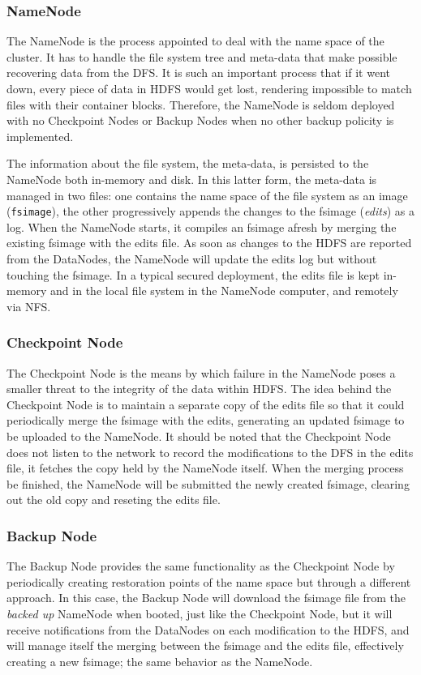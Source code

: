 \subsubsection{NameNode}\label{subsubsec:namenode}
\noindent The NameNode is the process appointed to deal with the name space of the cluster. It has to handle the file system tree and meta-data that make possible recovering data from the DFS. It is such an important process that if it went down, every piece of data in HDFS would get lost, rendering impossible to match files with their container blocks. Therefore, the NameNode is seldom deployed with no Checkpoint Nodes or Backup Nodes when no other backup policity is implemented.

The information about the file system, the meta-data, is persisted to the NameNode both in-memory and disk. In this latter form, the meta-data is managed in two files: one contains the name space of the file system as an image (\texttt{fsimage}), the other progressively appends the changes to the fsimage (\emph{edits}) as a log. When the NameNode starts, it compiles an fsimage afresh by merging the existing fsimage with the edits file. As soon as changes to the HDFS are reported from the DataNodes, the NameNode will update the edits log but without touching the fsimage. In a typical secured deployment, the edits file is kept in-memory and in the local file system in the NameNode computer, and remotely via NFS.

\subsubsection{Checkpoint Node}\label{subsubsec:checkpointnode}
\noindent The Checkpoint Node is the means by which failure in the NameNode poses a smaller threat to the integrity of the data within HDFS. The idea behind the Checkpoint Node is to maintain a separate copy of the edits file so that it could periodically merge the fsimage with the edits, generating an updated fsimage to be uploaded to the NameNode. It should be noted that the Checkpoint Node does not listen to the network to record the modifications to the DFS in the edits file, it fetches the copy held by the NameNode itself. When the merging process be finished, the NameNode will be submitted the newly created fsimage, clearing out the old copy and reseting the edits file.

\subsubsection{Backup Node}\label{subsubsec:backupnode}
\noindent The Backup Node provides the same functionality as the Checkpoint Node by periodically creating restoration points of the name space but through a different approach. In this case, the Backup Node will download the fsimage file from the \emph{backed up} NameNode when booted, just like the Checkpoint Node, but it will receive notifications from the DataNodes on each modification to the HDFS, and will manage itself the merging between the fsimage and the edits file, effectively creating a new fsimage; the same behavior as the NameNode.


